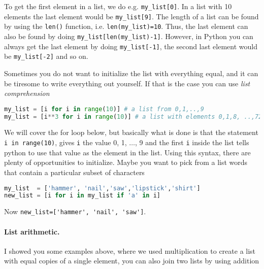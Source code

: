 \documentclass[graybox,sectrefs,envcountresetchap,open=right,final]{svmonodo}
\newenvironment{graybox2admon}[1][]{
\begin{graybox2mdframed}[frametitle=#1]
}
{
\end{graybox2mdframed}
}
\begin{document}
\begin{graybox2admon}[Notice]
To get the first element in a list, we do e.g. \Verb!my_list[0]!. In a list with 10 elements the last element would be \Verb!my_list[9]!. The length of a list can be found by using the \texttt{len()} function, i.e. \Verb!len(my_list)=10!. Thus, the last element can also be found by doing \Verb!my_list[len(my_list)-1]!. However, in Python you can always get the last element by doing \Verb!my_list[-1]!, the second last element would be \Verb!my_list[-2]! and so on.
\end{graybox2admon}



Sometimes you do not want to initialize the list with everything equal, and it can be tiresome to write everything out yourself. If that is the case you can use \emph{list comprehension}



\begin{lstlisting}[language=python,style=blue1bar]
my_list = [i for i in range(10)] # a list from 0,1,..,9
my_list = [i**3 for i in range(10)] # a list with elements 0,1,8, ..,729

\end{lstlisting}

We will cover the for loop below, but basically what is done is that the statement \texttt{i in range(10)}, gives \texttt{i} the value 0, 1, $\ldots$, 9 and the first \texttt{i} inside the list tells python to use that value as the element in the list. Using this syntax, there are plenty of opportunities to initialize. Maybe you want to pick from a list words that contain a particular subset of characters



\begin{lstlisting}[language=python,style=blue1bar]
my_list  = ['hammer', 'nail','saw','lipstick','shirt']
new_list = [i for i in my_list if 'a' in i]

\end{lstlisting}

Now \Verb!new_list=['hammer', 'nail', 'saw']!.

\paragraph{List arithmetic.}
I showed you some examples above, where we used multiplication to create a list with equal copies of a single element, you can also join two lists by using addition
\end{document}
